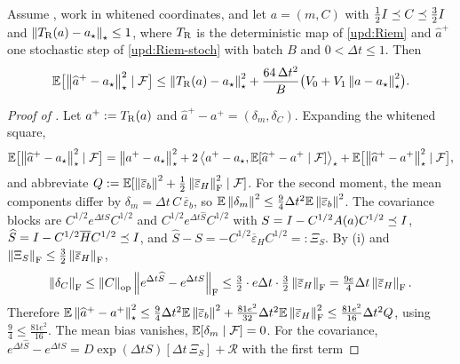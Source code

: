 \begin{lemma}
\label{lem:perturb-Riem}
Assume , work in whitened coordinates, and let
$a=(m,C)$ with $\tfrac12I\preceq C\preceq\tfrac32I$ and $\left\lVert T_{\mathrm{R}}(a)-a_\star\right\rVert_\star\leq1$,
where $T_{\mathrm{R}}$ is the deterministic map of \eqref{upd:Riem} and $\widehat a^+$ one stochastic step
of \eqref{upd:Riem-stoch} with batch $B$ and $0<\Delta t\leq1$. Then
\[
    \mathbb{E}\bigl[\left\lVert \widehat a^+-a_\star\right\rVert_\star^2\mid\mathcal{F}\bigr]
    \leq\left\lVert T_{\mathrm{R}}(a)-a_\star\right\rVert_\star^2+\frac{64\,\Delta t^2}{B}\bigl(V_0+V_1\left\lVert a-a_\star\right\rVert_\star^2\bigr).
\]
\end{lemma}

\begin{proof}[Proof of ]
Let $a^+:=T_{\mathrm{R}}(a)$ and $\widehat a^+-a^+=(\delta_m,\delta_C)$. Expanding the whitened square,
\begin{equation}
\label{eq:perturb-expand}
    \mathbb{E}\bigl[\left\lVert \widehat a^+-a_\star\right\rVert_\star^2\mid\mathcal{F}\bigr]
    =\left\lVert a^+-a_\star\right\rVert_\star^2
    +2\left\langle a^+-a_\star,\mathbb{E}[\widehat a^+-a^+\mid\mathcal{F}]\right\rangle_\star
    +\mathbb{E}\bigl[\left\lVert \widehat a^+-a^+\right\rVert_\star^2\mid\mathcal{F}\bigr],
\end{equation}
and abbreviate $Q:=\mathbb{E}[\left\lVert \overline\varepsilon_b\right\rVert^2+\tfrac12\left\lVert \overline\varepsilon_H\right\rVert_{\mathrm{F}}^2\mid\mathcal{F}]$.
For the second moment, the mean components differ by $\delta_m=\Delta t\,C\,\overline\varepsilon_b$, so
$\mathbb{E}\left\lVert \delta_m\right\rVert^2\leq\tfrac94\Delta t^2\mathbb{E}\left\lVert \overline\varepsilon_b\right\rVert^2$. The covariance blocks are
$C^{1/2}e^{\Delta tS}C^{1/2}$ and $C^{1/2}e^{\Delta t\widehat S}C^{1/2}$ with
$S=I-C^{1/2}A(a)C^{1/2}\preceq I$, $\widehat S=I-C^{1/2}\overline HC^{1/2}\preceq I$, and
$\widehat S-S=-C^{1/2}\overline\varepsilon_HC^{1/2}=:\Xi_S$. By (i) and
$\left\lVert \Xi_S\right\rVert_{\mathrm{F}}\leq\tfrac32\left\lVert \overline\varepsilon_H\right\rVert_{\mathrm{F}}$,
\[
    \left\lVert \delta_C\right\rVert_{\mathrm{F}}\leq\left\lVert C\right\rVert_{\mathrm{op}}\left\lVert e^{\Delta t\widehat S}-e^{\Delta tS}\right\rVert_{\mathrm{F}}
    \leq\tfrac32\cdot e\Delta t\cdot\tfrac32\left\lVert \overline\varepsilon_H\right\rVert_{\mathrm{F}}
    =\tfrac{9e}4\Delta t\left\lVert \overline\varepsilon_H\right\rVert_{\mathrm{F}}.
\]
Therefore
$\mathbb{E}\left\lVert \widehat a^+-a^+\right\rVert_\star^2\leq\tfrac94\Delta t^2\mathbb{E}\left\lVert \overline\varepsilon_b\right\rVert^2+\tfrac{81e^2}{32}\Delta t^2\mathbb{E}\left\lVert \overline\varepsilon_H\right\rVert_{\mathrm{F}}^2\leq\tfrac{81e^2}{16}\Delta t^2Q$,
using $\tfrac94\leq\tfrac{81e^2}{16}$.
The mean bias vanishes, $\mathbb{E}[\delta_m\mid\mathcal{F}]=0$. For the covariance,
$e^{\Delta t\widehat S}-e^{\Delta tS}=D\exp(\Delta tS)[\Delta t\,\Xi_S]+\mathcal R$ with the first term

\end{proof}
